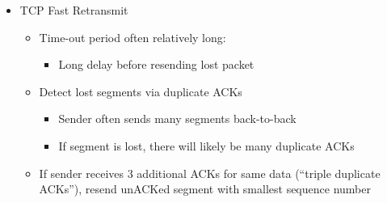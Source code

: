 \begin{itemize}
  \item TCP Fast Retransmit

    \begin{itemize}

      \item Time-out period often relatively long:

        \begin{itemize}

          \item Long delay before resending lost packet

        \end{itemize}

      \item Detect lost segments via duplicate ACKs

        \begin{itemize}

          \item Sender often sends many segments back-to-back

          \item If segment is lost, there will likely be many duplicate ACKs

        \end{itemize}

      \item If sender receives 3 additional ACKs for same data (``triple duplicate ACKs''), resend unACKed segment with smallest sequence number

    \end{itemize}

\end{itemize}



